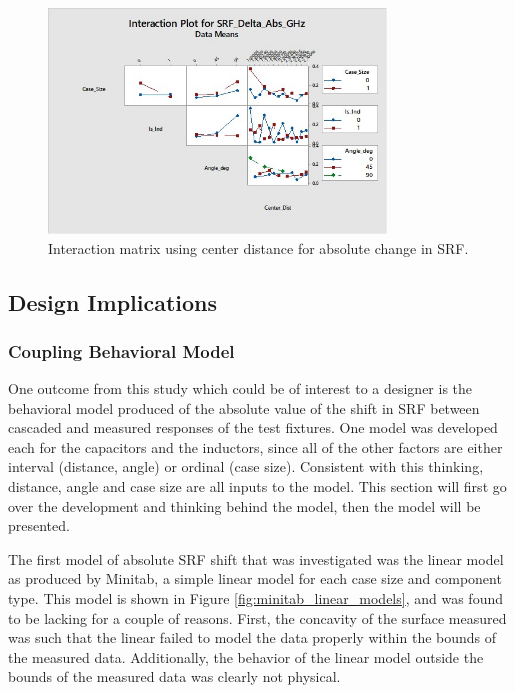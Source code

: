 \documentclass[12pt]{usfcoe}
\begin{document}
    \begin{figure}[H]
		\begin{center}
        	\includegraphics[width=0.8\textwidth]{images/ANOVA/interactions_abs_delta_srf.jpg} 
			\caption{Interaction matrix using center distance for absolute change in SRF.} 
			\label{fig:interaction_abs_delta_srf}
		\end{center}
    \end{figure}    


    \subsection{Design Implications}

    \subsubsection{Coupling Behavioral Model}
    One outcome from this study which could be of interest to a designer is the behavioral model produced of the absolute value of the shift in SRF between cascaded and measured responses of the test fixtures. 
    One model was developed each for the capacitors and the inductors, since all of the other factors are either interval (distance, angle) or ordinal (case size).
    Consistent with this thinking, distance, angle and case size are all inputs to the model. 
    This section will first go over the development and thinking behind the model, then the model will be presented. 

    The first model of absolute SRF shift that was investigated was the linear model as produced by Minitab, a simple linear model for each case size and component type. 
    This model is shown in Figure \ref{fig:minitab_linear_models}, and was found to be lacking for a couple of reasons. 
    First, the concavity of the surface measured was such that the linear failed to model the data properly within the bounds of the measured data. 
    Additionally, the behavior of the linear model outside the bounds of the measured data was clearly not physical.
    
\end{document}
